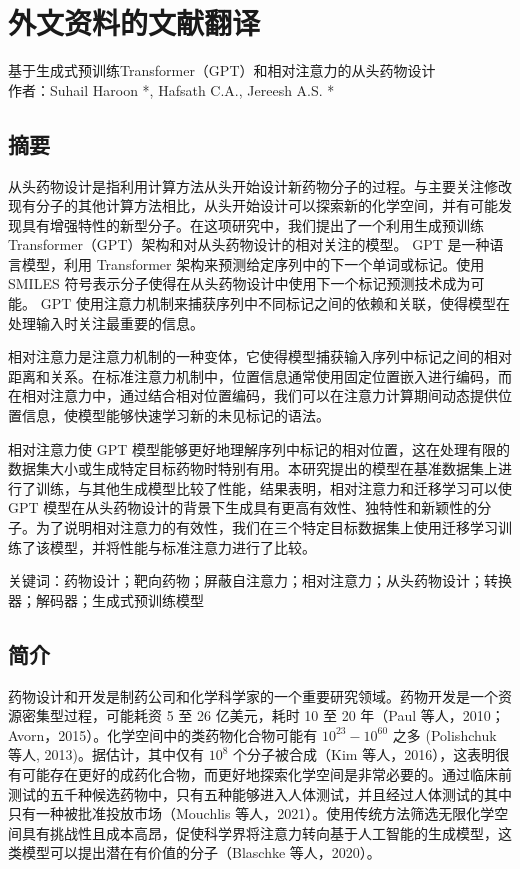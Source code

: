 \chapter{外文资料的文献翻译}

\begin{center}
  基于生成式预训练Transformer（GPT）和相对注意力的从头药物设计 \\
  作者：Suhail Haroon *, Hafsath C.A., Jereesh A.S. *
\end{center}

\section*{摘要}
\begin{center}
  
  从头药物设计是指利用计算方法从头开始设计新药物分子的过程。与主要关注修改现有分子的其他计算方法相比，从头开始设计可以探索新的化学空间，并有可能发现具有增强特性的新型分子。在这项研究中，我们提出了一个利用生成预训练Transformer（GPT）架构和对从头药物设计的相对关注的模型。 GPT 是一种语言模型，利用 Transformer 架构来预测给定序列中的下一个单词或标记。使用 SMILES 符号表示分子使得在从头药物设计中使用下一个标记预测技术成为可能。 GPT 使用注意力机制来捕获序列中不同标记之间的依赖和关联，使得模型在处理输入时关注最重要的信息。
  
  相对注意力是注意力机制的一种变体，它使得模型捕获输入序列中标记之间的相对距离和关系。在标准注意力机制中，位置信息通常使用固定位置嵌入进行编码，而在相对注意力中，通过结合相对位置编码，我们可以在注意力计算期间动态提供位置信息，使模型能够快速学习新的未见标记的语法。
  
  相对注意力使 GPT 模型能够更好地理解序列中标记的相对位置，这在处理有限的数据集大小或生成特定目标药物时特别有用。本研究提出的模型在基准数据集上进行了训练，与其他生成模型比较了性能，结果表明，相对注意力和迁移学习可以使 GPT 模型在从头药物设计的背景下生成具有更高有效性、独特性和新颖性的分子。为了说明相对注意力的有效性，我们在三个特定目标数据集上使用迁移学习训练了该模型，并将性能与标准注意力进行了比较。

\end{center}
{关键词：药物设计；靶向药物；屏蔽自注意力；相对注意力；从头药物设计；转换器；解码器；生成式预训练模型}

\section{简介}

药物设计和开发是制药公司和化学科学家的一个重要研究领域。药物开发是一个资源密集型过程，可能耗资 5 至 26 亿美元，耗时 10 至 20 年（Paul 等人，2010；Avorn，2015）。化学空间中的类药物化合物可能有 $10^{23}-10^{60}$ 之多 (Polishchuk 等人, 2013)。据估计，其中仅有 $10^8$ 个分子被合成（Kim 等人，2016），这表明很有可能存在更好的成药化合物，而更好地探索化学空间是非常必要的。通过临床前测试的五千种候选药物中，只有五种能够进入人体测试，并且经过人体测试的其中只有一种被批准投放市场（Mouchlis 等人，2021）。使用传统方法筛选无限化学空间具有挑战性且成本高昂，促使科学界将注意力转向基于人工智能的生成模型，这类模型可以提出潜在有价值的分子（Blaschke 等人，2020）。

